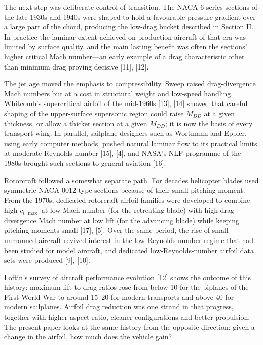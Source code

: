 \documentclass[10pt,a4paper,twocolumn]{article}
\begin{document}
The next step was deliberate control of transition. The NACA 6-series
sections of the late 1930s and 1940s were shaped to hold a favourable
pressure gradient over a large part of the chord, producing the low-drag
bucket described in Section II. In practice the laminar extent achieved
on production aircraft of that era was limited by surface quality, and
the main lasting benefit was often the sections' higher critical Mach
number---an early example of a drag characteristic other than minimum
drag proving decisive {[}11{]}, {[}12{]}.

The jet age moved the emphasis to compressibility. Sweep raised
drag-divergence Mach numbers but at a cost in structural weight and
low-speed handling. Whitcomb's supercritical airfoil of the mid-1960s
{[}13{]}, {[}14{]} showed that careful shaping of the upper-surface
supersonic region could raise \(M_{DD}\) at a given thickness, or allow
a thicker section at a given \(M_{DD}\); it is now the basis of every
transport wing. In parallel, sailplane designers such as Wortmann and
Eppler, using early computer methods, pushed natural laminar flow to its
practical limits at moderate Reynolds number {[}15{]}, {[}4{]}, and
NASA's NLF programme of the 1980s brought such sections to general
aviation {[}16{]}.

Rotorcraft followed a somewhat separate path. For decades helicopter
blades used symmetric NACA 0012-type sections because of their small
pitching moment. From the 1970s, dedicated rotorcraft airfoil families
were developed to combine high \(c_{l,\max}\) at low Mach number (for
the retreating blade) with high drag-divergence Mach number at low lift
(for the advancing blade) while keeping pitching moments small {[}17{]},
{[}5{]}. Over the same period, the rise of small unmanned aircraft
revived interest in the low-Reynolds-number regime that had been studied
for model aircraft, and dedicated low-Reynolds-number airfoil data sets
were produced {[}9{]}, {[}10{]}.

Loftin's survey of aircraft performance evolution {[}12{]} shows the
outcome of this history: maximum lift-to-drag ratios rose from below 10
for the biplanes of the First World War to around 15--20 for modern
transports and above 40 for modern sailplanes. Airfoil drag reduction
was one strand in that progress, together with higher aspect ratio,
cleaner configurations and better propulsion. The present paper looks at
the same history from the opposite direction: given a change in the
airfoil, how much does the vehicle gain?
\end{document}

